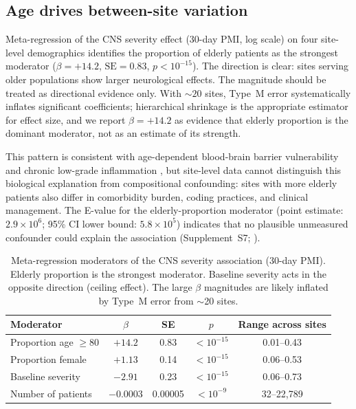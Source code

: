 \documentclass[11pt]{article}
\begin{document}
\subsection{Age drives between-site variation}

Meta-regression of the CNS severity effect (30-day PMI, log scale) on four
site-level demographics identifies the proportion of elderly patients as the
strongest moderator ($\beta = +14.2$, $\text{SE} = 0.83$,
$p < 10^{-15}$).  The direction is clear: sites serving older populations
show larger neurological effects.  The magnitude should be treated as
directional evidence only.  With ${\sim}20$ sites, Type~M error
\cite{gelman2014typeMS} systematically inflates significant coefficients;
hierarchical shrinkage is the appropriate estimator for effect size, and
we report $\beta = +14.2$ as evidence that elderly proportion is the
dominant moderator, not as an estimate of its strength.

This pattern is consistent with age-dependent blood-brain barrier
vulnerability \cite{montagne2015bbb} and chronic low-grade inflammation
\cite{franceschi2018inflammaging}, but site-level data cannot distinguish
this biological explanation from compositional confounding: sites with more
elderly patients also differ in comorbidity burden, coding practices, and
clinical management.  The E-value for the elderly-proportion moderator
(point estimate: $2.9 \times 10^{6}$; 95\% CI lower bound:
$5.8 \times 10^{5}$) indicates that no plausible unmeasured confounder
could explain the association (Supplement~S7; \cite{vanderweele2017}).

\begin{table}[t]
\centering
\caption{Meta-regression moderators of the CNS severity association (30-day
PMI).  Elderly proportion is the strongest moderator.  Baseline severity
acts in the opposite direction (ceiling effect).  The large $\beta$
magnitudes are likely inflated by Type~M error \cite{gelman2014typeMS} from
$\sim$20 sites.}
\label{tab:moderators}
\begin{tabular}{lcccc}
\toprule
Moderator & $\beta$ & SE & $p$ & Range across sites \\
\midrule
Proportion age $\geq 80$ & $+14.2$ & 0.83 & $< 10^{-15}$ & 0.01--0.43 \\
Proportion female & $+1.13$ & 0.14 & $< 10^{-15}$ & 0.06--0.53 \\
Baseline severity & $-2.91$ & 0.23 & $< 10^{-15}$ & 0.06--0.73 \\
Number of patients & $-0.0003$ & 0.00005 & $< 10^{-9}$ & 32--22{,}789 \\
\bottomrule
\end{tabular}
\end{table}
\end{document}
